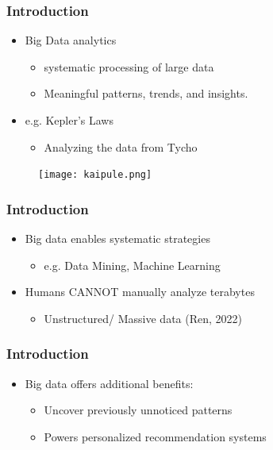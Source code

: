 \documentclass{beamer}
\begin{document}
\begin{frame}
 \frametitle{Introduction}
\begin{minipage}{\textwidth}
{\linespread{1.5}
\begin{itemize}
\item <1-> {\Large Big Data analytics}
    \begin{itemize}
        \item {\large systematic processing of large data}
        \item {\large Meaningful patterns, trends, and insights.}
    \end{itemize}
\item <2-> {\Large e.g. Kepler's Laws}
    \begin{itemize}
        \item {\large Analyzing the data from Tycho} 
    \end{itemize}
\end{itemize}
\begin{figure}
    \centering
    \texttt{[image: kaipule.png]}
    \label{fig:enter-label}
\end{figure}
}
\end{minipage}
\end{frame}


\begin{frame}
 \frametitle{Introduction}
\begin{minipage}{\textwidth}
{\linespread{2}
\begin{itemize}
\item <1-> {\LARGE Big data enables systematic strategies}
    \begin{itemize}
        \item {\Large e.g. Data Mining, Machine Learning}
    \end{itemize}
\item <2-> {\LARGE Humans CANNOT manually analyze terabytes}
    \begin{itemize}
        \item {\Large Unstructured/ Massive data} (Ren, 2022)
    \end{itemize}
\end{itemize}
}
\end{minipage}
\end{frame}


\begin{frame}
 \frametitle{Introduction}
\begin{minipage}{\textwidth}
{\linespread{2}
\begin{itemize}
    \item {\LARGE Big data offers additional benefits:}
    \begin{itemize}
        \item <1-> {\large Uncover previously unnoticed patterns}
        \item <2-> {\large Powers personalized recommendation systems}
    \end{itemize}
\end{itemize}
}
\end{minipage}
\end{frame}
\end{document}
